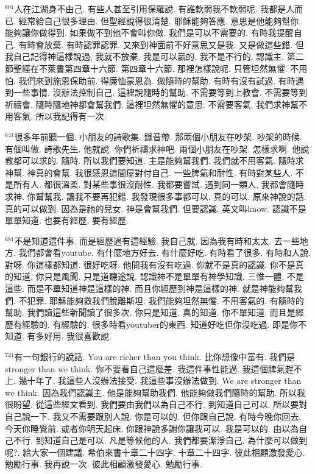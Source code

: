 \documentclass{book}
\begin{document}
$^{601}$人在江湖身不由己.
有些人甚至引用保羅說.
有誰軟弱我不軟弱呢.
我都是人而已.
經常給自己很多理由.
但聖經說得很清楚.
耶穌能夠答應.
意思是他能夠幫你.
能夠讓你做得到.
如果做不到他不會叫你做.
我們是可以不需要的.
有時我提醒自己.
有時會放棄.
有時認罪認罪.
又來到神面前不好意思又是我.
又是做這些錯.
但我自己記得神這樣說過.
我就不放棄.
我是可以贏的.
我不是不行的.
認識主.
第二節聖經在不萊書第四章十六節.
第四章十六節.
那裡怎樣說呢.
只管坦然無懼.
不用怕.
我們來到施恩保助前.
得廉恤蒙恩為.
做隨時的幫助.
有時有沒有試過.
有時遇到一些事情.
沒辦法控制自己.
這裡說隨時的幫助.
不需要等到上教會.
不需要等到祈禱會.
隨時隨地神都會幫我們.
這裡坦然無懼的意思.
不需要客氣.
我們求神幫不用客氣.
所以我記得有一次.

$^{641}$很多年前聽一個.
小朋友的詩歌集.
錄音帶.
那兩個小朋友在吵架.
吵架的時候.
有個叫做.
詩歌先生.
他就說.
你們祈禱求神吧.
兩個小朋友在吵架.
怎樣求啊.
他說教都可以求的.
隨時.
所以我們要知道.
主是能夠幫我們.
我們就不用客氣.
隨時求神幫.
神真的會幫.
我很感恩這間屋對付自己.
一些脾氣和耐性.
有時對某些人.
不是所有人.
都很溫柔.
對某些事很沒耐性.
我都要嘗試.
遇到同一類人.
我都會隨時求神.
你幫幫我.
讓我不要再犯錯.
我發現很多事都可以.
真的可以.
原來神說的話.
真的可以做到.
因為是祂的兒女.
神是會幫我們.
但要認識.
英文叫know.
認識不是單單知道.
也要有經歷.
要有經歷.

$^{681}$不是知道這件事.
而是經歷過有這經驗.
我自己就.
因為我有時和太太.
去一些地方.
我們都會看youtube.
有什麼地方好去.
有什麼好吃.
有時看了很多.
有時和人說.
對呀.
你這樣都知道.
很好吃呀.
他問我有沒有吃過.
你就不是真的認識.
你不是真的知道.
你只是風聞.
只是道聽途說.
認識神不是單單有神學知識.
三惟一體.
不是這些.
而是不單知道神是這樣的神.
而且你經歷到神是這樣的神.
就是神能夠幫我們.
不犯罪.
耶穌能夠救我們脫離斯坦.
我們能夠坦然無懼.
不用客氣的.
有隨時的幫助.
我們讀這些新聞讀了很多次.
你只是知道.
真的知道.
你不單知道.
而且是經歷有經驗的.
有經驗的.
很多時看youtuber的東西.
知道好吃但你沒吃過.
即是你不知道.
有多好用.
我很喜歡說.

$^{721}$有一句銀行的說話.
You are richer than you think.
比你想像中富有.
我們是stronger than we think.
你不要看自己這麼差.
我這件事性能過.
我這個脾氣趕不上.
幾十年了.
我這些人沒辦法接受.
我這些事沒辦法做到.
We are stronger than we think.
因為我們認識主.
他是能夠幫助我們.
他能夠做我們隨時的幫助.
所以我很盼望.
從這些經文看到.
我們要由我們以為自己不行.
到知道自己可以.
所以要對自己說一下.
我又不需要跟別人說.
你是可以的.
但你跟自己說.
有時今晚你回去.
今天你睡覺前.
或者你明天起床.
你跟神說多謝你讓我可以.
我是可以的.
由以為自己不行.
到知道自己是可以.
凡是等候他的人.
我們都要潔淨自己.
為什麼可以做到呢?.
給大家一個建議.
希伯來書十章二十四字.
十章二十四字.
彼此相顧激發愛心.
勉勵行事.
我再說一次.
彼此相顧激發愛心.
勉勵行事.
\end{document}
